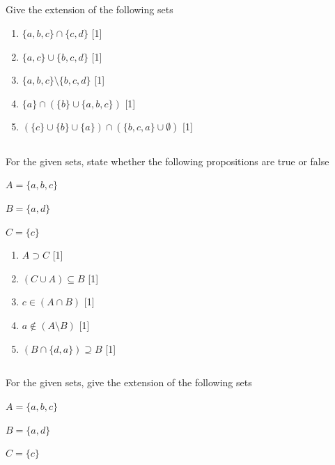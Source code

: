 \documentclass[twocolumn]{article}
\newcounter{pmarks}
\newcounter{marks}
\newcommand\mrk[1]{{\hfill\color{blue}\small[{#1}]}\addtocounter{pmarks}{#1}\addtocounter{marks}{#1}}
\begin{document}
\subsection{}

    Give the extension of the following sets

    \begin{enumerate}
        \item $\{ a, b, c \} \cap \{ c, d \} $ \mrk{1}
        \item $\{ a, c \} \cup \{ b, c, d \} $ \mrk{1}
        \item $\{ a, b, c \} \setminus \{ b, c, d \} $ \mrk{1}
        \item $\{ a \} \cap ( \{ b \} \cup \{a, b, c\} ) $ \mrk{1}
        \item $ (\{ c \} \cup \{ b \} \cup \{a\}) \cap ( \{b, c, a\} \cup \emptyset ) $ \mrk{1}
    \end{enumerate}

\subsection{}

    For the given sets, state whether the following propositions are true or false

    $ A = \{ a, b, c \} $

    $ B = \{ a, d \} $

    $ C = \{ c \} $

    \begin{enumerate}
        \item $ A \supset C $ \mrk{1}
        \item $ (C \cup A) \subseteq B $ \mrk{1}
        \item $ c \in ( A \cap B ) $ \mrk{1}
        \item $ a \not \in ( A \setminus B ) $ \mrk{1}
        \item $(B \cap \{d, a\} ) \supseteq B$ \mrk{1}
    \end{enumerate}

\subsection{}

    For the given sets, give the extension of the following sets

    $ A = \{ a, b, c \} $

    $ B = \{ a, d \} $

    $ C = \{ c \} $
\end{document}
